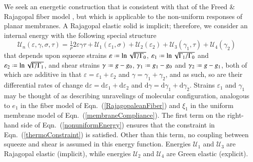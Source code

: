 We seek an energetic construction that is consistent with that of the Freed \& Rajagopal fiber model \cite{FreedRajagopal16}, but which is applicable to the non-uniform responses of planar membranes.  A Rajagopal elastic solid is implicit; therefore, we consider an internal energy with the following special structure
\begin{equation}
\mathcal{U}_n ( \varepsilon , \gamma , \sigma , \tau ) = \tfrac{1}{\rho} 2 \varepsilon \gamma \tau + \mathcal{U}_1 ( \varepsilon_1 , \sigma ) + \mathcal{U}_2 ( \varepsilon_2 ) + \mathcal{U}_3 ( \gamma_1 , \tau ) + \mathcal{U}_4 ( \gamma_2 )
\label{nonuniformEnergy}
\end{equation}
that depends upon squeeze strains $\varepsilon \defeq \ln \sqrt{\Gamma \! / \Gamma_0}$, $\varepsilon_1 \defeq \ln \sqrt{ \Gamma_1 / \Gamma_0}$ and $\varepsilon_2 \defeq \ln \sqrt{ \Gamma \! / \Gamma_1}$, and shear strains $\gamma \defeq g - g_0$, $\gamma_1 \defeq g_1 - g_0$ and $\gamma_2 \defeq g - g_1$, both of which are additive in that $\varepsilon = \varepsilon_1 + \varepsilon_2$ and $\gamma = \gamma_1 + \gamma_2$, and as such, so are their differential rates of change $\mathrm{d} \varepsilon = \mathrm{d} \varepsilon_1 + \mathrm{d} \varepsilon_2$ and $\mathrm{d} \gamma = \mathrm{d} \gamma_1 + \mathrm{d} \gamma_2$.  Strains $\varepsilon_1$ and $\gamma_1$ may be thought of as describing unravelings of molecular configuration, analogous to $e_1$ in the fiber model of Eqn.~(\ref{RajagopaleanFiber}) and $\xi_1$ in the uniform membrane model of Eqn.~(\ref{membraneCompliance}).  The first term on the right-hand side of Eqn.~(\ref{nonuniformEnergy}) ensures that the constraint in Eqn.~(\ref{thermoConstraint}) is satisfied.  Other than this term, no coupling between squeeze and shear is assumed in this energy function.  Energies $\mathcal{U}_1$ and $\mathcal{U}_3$ are Rajagopal elastic (implicit), while energies $\mathcal{U}_2$ and $\mathcal{U}_4$ are Green elastic (explicit).

